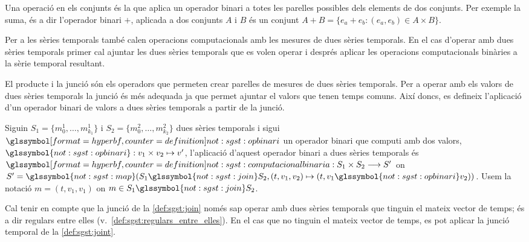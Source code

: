 Una operació en els conjunts és la que aplica un operador binari a
totes les parelles possibles dels elements de dos conjunts. Per
exemple la suma, és a dir l'operador binari $+$, aplicada a dos
conjunts $A$ i $B$ és un conjunt $A + B = \{ e_a+e_b : (e_a,e_b) \in
A\times B \}$.

Per a les sèries temporals també calen operacions computacionals amb
les mesures de dues sèries temporals. En el cas d'operar amb dues
sèries temporals primer cal ajuntar les dues sèries temporals que es
volen operar i després aplicar les operacions computacionals binàries
a la sèrie temporal resultant.


El producte i la junció són els operadors que permeten crear parelles
de mesures de dues sèries temporals. Per a operar amb els valors de
dues sèries temporals la junció és més adequada ja que permet ajuntar
el valors que tenen temps comuns. Així doncs, es defineix l'aplicació
d'un operador binari de valors a dues sèries temporals a partir de la
junció.
\begin{definition}
  Siguin $S_1=\{m_0^1, \dotsc, m_{k_1}^1\}$ i $S_2=\{m_0^2, \dotsc,
  m_{k_2}^2\}$ dues sèries temporals i sigui
  $\glssymboldef{not:sgst:opbinari}$ un operador binari que computi
  amb dos valors, $\glssymbol{not:sgst:opbinari}:v_1 \times v_2
  \mapsto v'$, l'aplicació d'aquest operador binari a dues sèries
  temporals és $\glssymboldef{not:sgst:computacionalbinaria}: S_1
  \times S_2 \longrightarrow S'$ on $S' = \glssymbol{not:sgst:map}
  (S_1 \glssymbol{not:sgst:join} S_2, (t,v_1,v_2) \mapsto (t,v_1
  \glssymbol{not:sgst:opbinari} v_2))$. Usem la notació
  $m=(t,v_1,v_1)$ on $m\in S_1 \glssymbol{not:sgst:join} S_2$.
\end{definition}

Cal tenir en compte que la junció de la \autoref{def:sgst:join} només
sap operar amb dues sèries temporals que tinguin el mateix vector de
temps; és a dir regulars entre elles (v.\ \autoref{def:sgst:regulars_entre_elles}). En el cas que no tinguin el mateix vector
de temps, es pot aplicar la junció temporal de la
\autoref{def:sgst:joint}.


